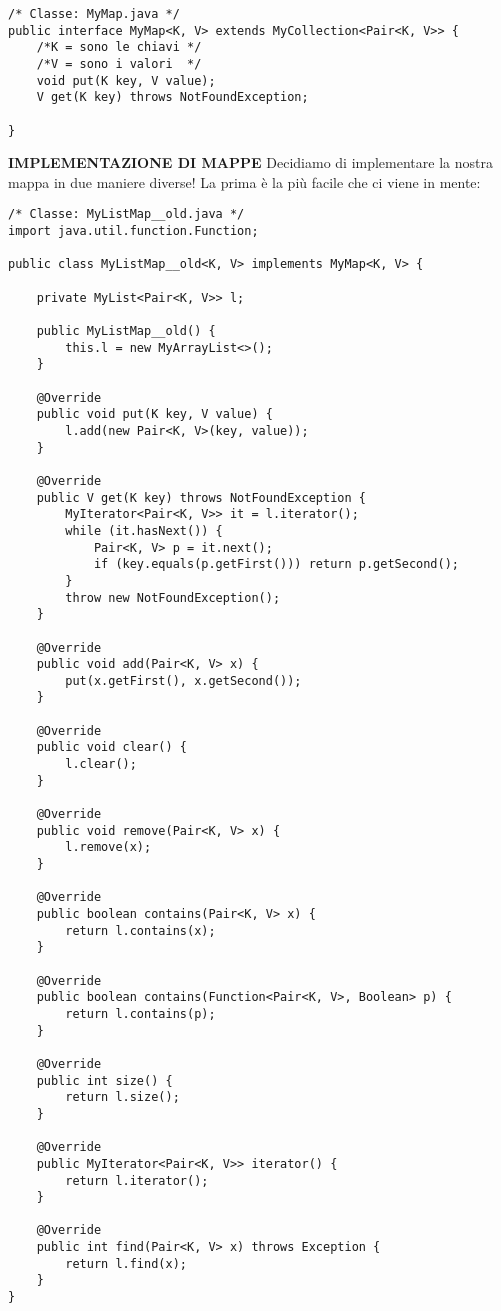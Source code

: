 \begin{lstlisting}[basicstyle=\small,]
/* Classe: MyMap.java */
public interface MyMap<K, V> extends MyCollection<Pair<K, V>> {
	/*K = sono le chiavi */
	/*V = sono i valori  */
    void put(K key, V value);
    V get(K key) throws NotFoundException;

}
\end{lstlisting}

\noindent \textbf{IMPLEMENTAZIONE DI MAPPE}\newline
\noindent Decidiamo di implementare la nostra mappa in due maniere diverse! La prima è la più facile che ci viene in mente:

\begin{lstlisting}[basicstyle=\small,]
/* Classe: MyListMap__old.java */
import java.util.function.Function;

public class MyListMap__old<K, V> implements MyMap<K, V> {

    private MyList<Pair<K, V>> l;

    public MyListMap__old() {
        this.l = new MyArrayList<>();
    }

    @Override
    public void put(K key, V value) {
        l.add(new Pair<K, V>(key, value));
    }

    @Override
    public V get(K key) throws NotFoundException {
        MyIterator<Pair<K, V>> it = l.iterator();
        while (it.hasNext()) {
            Pair<K, V> p = it.next();
            if (key.equals(p.getFirst())) return p.getSecond();
        }
        throw new NotFoundException();
    }

    @Override
    public void add(Pair<K, V> x) {
        put(x.getFirst(), x.getSecond());
    }

    @Override
    public void clear() {
        l.clear();
    }

    @Override
    public void remove(Pair<K, V> x) {
        l.remove(x);
    }

    @Override
    public boolean contains(Pair<K, V> x) {
        return l.contains(x);
    }

    @Override
    public boolean contains(Function<Pair<K, V>, Boolean> p) {
        return l.contains(p);
    }

    @Override
    public int size() {
        return l.size();
    }

    @Override
    public MyIterator<Pair<K, V>> iterator() {
        return l.iterator();
    }

    @Override
    public int find(Pair<K, V> x) throws Exception {
        return l.find(x);
    }
}
\end{lstlisting}

